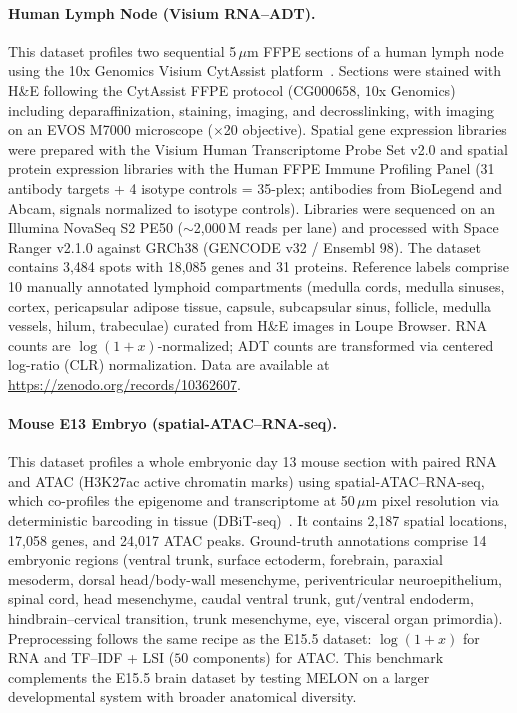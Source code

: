 \documentclass{article}
\theoremstyle{plain}
\theoremstyle{definition}
\begin{document}
\paragraph{Human Lymph Node (Visium RNA--ADT).}
This dataset profiles two sequential 5\,$\mu$m FFPE sections of a human lymph node using the 10x Genomics Visium CytAssist platform~\cite{long2024spatialglue}. Sections were stained with H\&E following the CytAssist FFPE protocol (CG000658, 10x Genomics) including deparaffinization, staining, imaging, and decrosslinking, with imaging on an EVOS M7000 microscope ($\times$20 objective). Spatial gene expression libraries were prepared with the Visium Human Transcriptome Probe Set v2.0 and spatial protein expression libraries with the Human FFPE Immune Profiling Panel (31 antibody targets + 4 isotype controls = 35-plex; antibodies from BioLegend and Abcam, signals normalized to isotype controls). Libraries were sequenced on an Illumina NovaSeq S2 PE50 ($\sim$2{,}000\,M reads per lane) and processed with Space Ranger v2.1.0 against GRCh38 (GENCODE v32 / Ensembl 98). The dataset contains 3{,}484 spots with 18{,}085 genes and 31 proteins. Reference labels comprise 10 manually annotated lymphoid compartments (medulla cords, medulla sinuses, cortex, pericapsular adipose tissue, capsule, subcapsular sinus, follicle, medulla vessels, hilum, trabeculae) curated from H\&E images in Loupe Browser. RNA counts are $\log(1+x)$-normalized; ADT counts are transformed via centered log-ratio (CLR) normalization. Data are available at \url{https://zenodo.org/records/10362607}.

\paragraph{Mouse E13 Embryo (spatial-ATAC--RNA-seq).}
This dataset profiles a whole embryonic day 13 mouse section with paired RNA and ATAC (H3K27ac active chromatin marks) using spatial-ATAC--RNA-seq, which co-profiles the epigenome and transcriptome at 50\,$\mu$m pixel resolution via deterministic barcoding in tissue (DBiT-seq)~\cite{zhang2023spatial}. It contains 2{,}187 spatial locations, 17{,}058 genes, and 24{,}017 ATAC peaks. Ground-truth annotations comprise 14 embryonic regions (ventral trunk, surface ectoderm, forebrain, paraxial mesoderm, dorsal head/body-wall mesenchyme, periventricular neuroepithelium, spinal cord, head mesenchyme, caudal ventral trunk, gut/ventral endoderm, hindbrain--cervical transition, trunk mesenchyme, eye, visceral organ primordia). Preprocessing follows the same recipe as the E15.5 dataset: $\log(1+x)$ for RNA and TF--IDF + LSI ($50$ components) for ATAC. This benchmark complements the E15.5 brain dataset by testing MELON on a larger developmental system with broader anatomical diversity.
\end{document}
